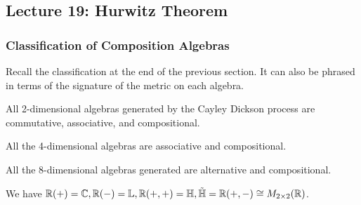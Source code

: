 \subsection{Lecture 19: Hurwitz Theorem}
\subsubsection{Classification of Composition Algebras}
Recall the classification at the end of the previous section. It can also be phrased in terms of the signature of the metric on each algebra.

\begin{center}
\end{center} 
\begin{cor}
All 2-dimensional algebras generated by the Cayley Dickson process are commutative, associative, and compositional. 

All the 4-dimensional algebras are associative and compositional.

All the 8-dimensional algebras generated are alternative and compositional.
\end{cor}
\begin{lemma}
    We have $\operatorname{\mathbb{R}}(+)=\operatorname{\mathbb{C}},\operatorname{\mathbb{R}}(-)=\operatorname{\mathbb{L}},\operatorname{\mathbb{R}}(+,+)=\operatorname{\mathbb{H}},\tilde{\operatorname{\mathbb{H}}}=\operatorname{\mathbb{R}}(+,-)\cong M_{2\times 2}(\operatorname{\mathbb{R}})$.
\end{lemma}

